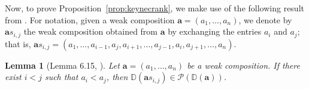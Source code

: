 \documentclass[letterpaper,10pt]{article}
\newtheorem{lemma}[theorem]{Lemma}
\begin{document}
Now, to prove Proposition~\ref{prop:keynecrank}, we make use of the following result from \textbf{\cite{KPoset1}}. For notation, given a weak composition $\mathbf{a}=(a_1,\hdots,a_n)$, we denote by $\mathbf{a}s_{i,j}$ the weak composition obtained from $\mathbf{a}$ by exchanging the entries $a_i$ and $a_j$; that is, $\mathbf{a}s_{i,j} =(a_1,\hdots,a_{i-1}, a_j,a_{i+1}, \hdots, a_{j-1}, a_i, a_{j+1}, \hdots, a_n).$

\begin{lemma}[Lemma 6.15, \textbf{\cite{KPoset1}}]\label{lem:permute}
    Let $\mathbf{a}=(a_1,\hdots,a_n)$ be a weak composition. If there exist $i<j$ such that $a_i<a_j$, then $\mathbb{D}(\mathbf{a}s_{i,j})\in \mathcal{P}(\mathbb{D}(\mathbf{a}))$.
\end{lemma}
\end{document}
